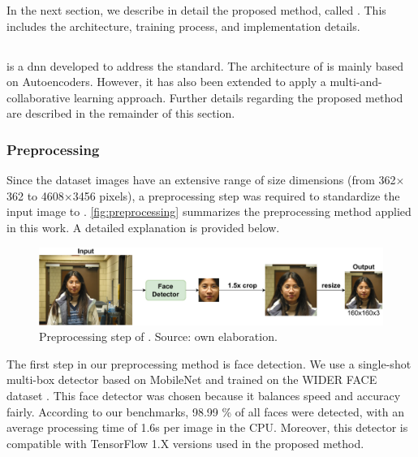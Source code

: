 In the next section, we describe in detail the proposed method, called \methodname. This includes the architecture, training process, and implementation details.
 
\subsection{\methodname}
 
\methodname is a \acl{dnn} developed to address the \icao standard. The architecture of \methodname is mainly based on Autoencoders. However, it has also been extended to apply a multi-and-collaborative learning approach. Further details regarding the proposed method are described in the remainder of this section. 
 
\subsubsection{Preprocessing} \label{sec:preprocessing}
 
Since the \adhoc dataset images have an extensive range of size dimensions (from 362$\times$362 to 4608$\times$3456 pixels), a preprocessing step was required to standardize the input image to \methodname. \autoref{fig:preprocessing} summarizes the preprocessing method applied in this work. A detailed explanation is provided below.
 
\begin{figure}[tb]
\centering
\includegraphics[width=\linewidth]{images/icaonet/preprocessing.pdf}
\caption{Preprocessing step of \methodname. Source: own elaboration.}
\label{fig:preprocessing}
\end{figure}
 
The first step in our preprocessing method is face detection. We use a single-shot multi-box detector based on MobileNet \citep{yeephycho} and trained on the WIDER FACE dataset \citep{yang2016wider}. This face detector was chosen because it balances speed and accuracy fairly. According to our benchmarks, 98.99 \% of all faces were detected, with an average processing time of 1.6s per image in the CPU. Moreover, this detector is compatible with TensorFlow 1.X versions used in the proposed method. 
 
